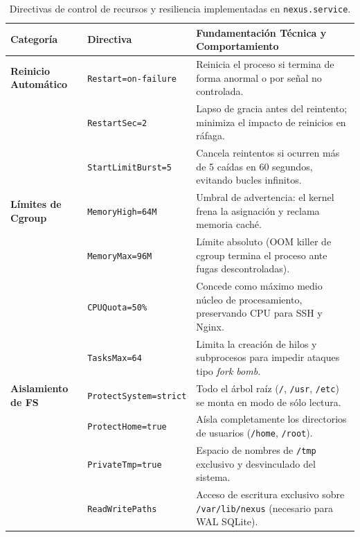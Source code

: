 \documentclass[10pt,a4paper]{article}
\begin{document}
\begin{table}[H]
    \centering
    \footnotesize
    \caption{Directivas de control de recursos y resiliencia implementadas en \texttt{nexus.service}.}
    \label{tab:systemd_resiliencia}
    \begin{tabularx}{\textwidth}{llX}
        \toprule
        \rowcolor{tableheader}
        \textbf{Categoría} & \textbf{Directiva} & \textbf{Fundamentación Técnica y Comportamiento} \\
        \midrule
        \textbf{Reinicio Automático} & \texttt{Restart=on-failure} & Reinicia el proceso si termina de forma anormal o por señal no controlada. \\
        & \texttt{RestartSec=2} & Lapso de gracia antes del reintento; minimiza el impacto de reinicios en ráfaga. \\
        & \texttt{StartLimitBurst=5} & Cancela reintentos si ocurren más de 5 caídas en 60 segundos, evitando bucles infinitos. \\
        \rowcolor{rowalt}
        \textbf{Límites de Cgroup} & \texttt{MemoryHigh=64M} & Umbral de advertencia: el kernel frena la asignación y reclama memoria caché. \\
        & \texttt{MemoryMax=96M} & Límite absoluto (OOM killer de cgroup termina el proceso ante fugas descontroladas). \\
        & \texttt{CPUQuota=50\%} & Concede como máximo medio núcleo de procesamiento, preservando CPU para SSH y Nginx. \\
        & \texttt{TasksMax=64} & Limita la creación de hilos y subprocesos para impedir ataques tipo \textit{fork bomb}. \\
        \rowcolor{rowalt}
        \textbf{Aislamiento de FS} & \texttt{ProtectSystem=strict} & Todo el árbol raíz (\texttt{/}, \texttt{/usr}, \texttt{/etc}) se monta en modo de sólo lectura. \\
        & \texttt{ProtectHome=true} & Aísla completamente los directorios de usuarios (\texttt{/home}, \texttt{/root}). \\
        & \texttt{PrivateTmp=true} & Espacio de nombres de \texttt{/tmp} exclusivo y desvinculado del sistema. \\
        & \texttt{ReadWritePaths} & Acceso de escritura exclusivo sobre \texttt{/var/lib/nexus} (necesario para WAL SQLite). \\
        \bottomrule
    \end{tabularx}
\end{table}
\end{document}
